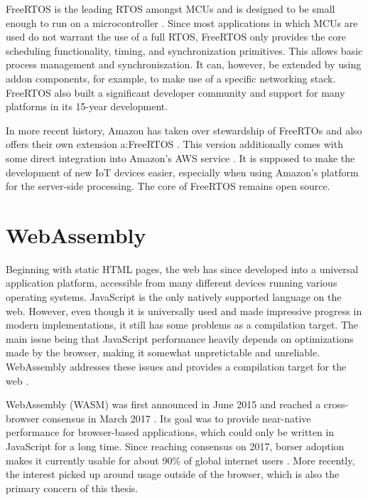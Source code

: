 FreeRTOS is the leading RTOS amongst MCUs and is designed to be small enough to run on a microcontroller \autocite{noauthor_freertos_nodate}. Since most applications in which MCUs are used do not warrant the use of a full RTOS, FreeRTOS only provides the core scheduling functionality, timing, and synchronization primitives. This allows basic process management and synchroniszation. It can, however, be extended by using addon components, for example, to make use of a specific networking stack. FreeRTOS also built a significant developer community and support for many platforms in its 15-year development.

In more recent history, Amazon has taken over stewardship of FreeRTOs and also offers their own extension a:FreeRTOS \autocite{lardinois_amazon_nodate}. This version additionally comes with some direct integration into Amazon's AWS service \autocite{noauthor_freertos_nodate-1}. It is supposed to make the development of new IoT devices easier, especially when using Amazon's platform for the server-side processing. The core of FreeRTOS remains open source.

\section{WebAssembly}\label{sec:b_wasm}

Beginning with static HTML pages, the web has since developed into a universal application platform, accessible from many different devices running various operating systems. JavaScript is the only natively supported language on the web. However, even though it is universally used and made impressive progress in modern implementations, it still has some problems as a compilation target. The main issue being that JavaScript performance heavily depends on optimizations made by the browser, making it somewhat unpretictable and unreliable. WebAssembly addresses these issues and provides a compilation target for the web \autocite{mdn_contributors_webassembly_nodate}.

WebAssembly (WASM) was first announced in June 2015 \autocite{wagner_webassembly_2015} and reached a cross-browser consensus in March 2017 \autocite{wagner_webassembly_2017-1}. Its goal was to provide near-native performance for browser-based applications, which could only be written in JavaScript for a long time. Since reaching consensus on 2017, borser adoption makes it currently usable for about 90\% of global internet users \autocite{deveria_can_nodate}. More recently, the interest picked up around usage outside of the browser, which is also the primary concern of this thesis.

